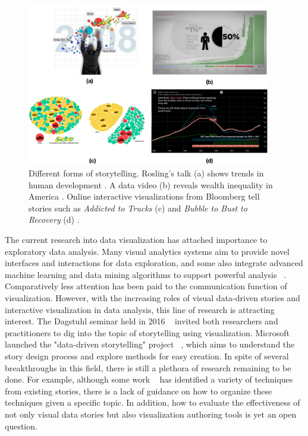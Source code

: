 \begin{figure}[htb]
	\centering 
	\includegraphics[width=0.95\textwidth]{figure/motivation.png} 
	\caption{Different forms of storytelling. Rosling's talk (a) shows trends in human development \cite{gapminder}. A data video (b) reveals wealth inequality in America \cite{inequality}. Online interactive  visualizations from Bloomberg tell stories such as \textit{Addicted to Trucks} (c) \cite{trunks} and \textit{Bubble to Bust to Recovery} (d) \cite{bust}.} 
	\label{motivation} 
\end{figure}

The current research into data visualization has attached importance to exploratory data analysis. Many visual analytics systems aim to provide novel interfaces and interactions for data exploration, and some also integrate advanced machine learning and data mining algorithms to support powerful analysis ~\cite{May2010}. Comparatively less attention has been paid to the communication function of visualization. However, with the increasing roles of visual data-driven stories and interactive visualization in data analysis, this line of research is attracting interest. The Dagstuhl seminar held in 2016 ~\cite{Carpendale2016} invited both researchers and practitioners to dig into the topic of storytelling using visualization.  Microsoft launched the "data-driven storytelling" project ~\cite{Microsoft}, which aims to understand the story design process and explore methods for easy creation. In spite of several breakthroughs in this field, there is still a plethora of research remaining to be done. For example, although some work ~\cite{Amini2015, Stolper2016, Segel2010} has identified a variety of techniques from existing stories, there is a lack of guidance on how to organize  these techniques given a specific topic. In addition, how to evaluate the effectiveness of not only visual data stories but also visualization authoring tools is yet an open question.


